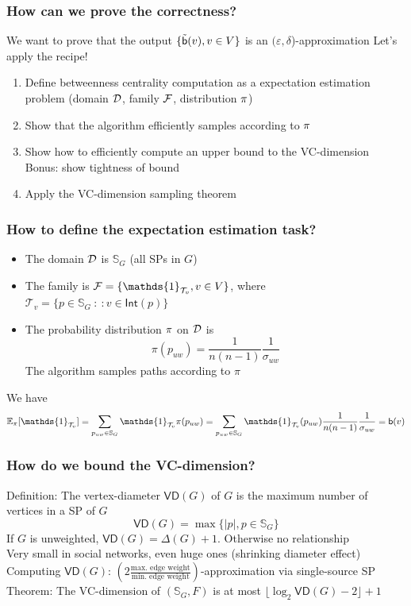 \begin{frame}
  \frametitle{How can we prove the correctness?}
  We want to prove that the output $\{\tilde{\mathsf{b}}(v), v\in V\}$ is an
  $(\varepsilon,\delta$)-approximation
  \vfill
  Let's apply the recipe!

  \begin{enumerate}
    \item  Define betweenness centrality computation as a expectation
      estimation problem (domain ${\cal D}$, family ${\cal F}$, distribution
      $\pi$)
    \item Show that the algorithm efficiently samples according to $\pi$
    \item Show how to efficiently compute an upper bound to the VC-dimension\\
      \quad Bonus: show tightness of bound
    \item Apply the VC-dimension sampling theorem
  \end{enumerate}
\end{frame}

\begin{frame}
  \frametitle{How to define the expectation estimation task?}
  \begin{itemize}
    \item The domain ${\cal D}$ is $\mathbb{S}_G$ (all SPs in $G$)\\
    \item The family is $\family=\{\mathds{1}_{\mathcal{T}_v}, v\in V\}$,
      where $\mathcal{T}_v=\{p\in\mathbb{S}_G ~:~: v\in\mathsf{Int}(p)\}$
    \item The probability distribution $\pi$ on ${\cal D}$ is
      \[
        \pi(p_{uw})=\frac{1}{n(n-1)}\frac{1}{\sigma_{uw}}
      \]
      The algorithm samples paths according to $\pi$
  \end{itemize}
  \vfill
  We have
  \[
    \expectation_\pi[\mathds{1}_{\mathcal{T}_v}]=\sum_{p_{uw}\in\mathbb{S}_G}\mathds{1}_{\mathcal{T}_v}\pi(p_{uw})=\sum_{p_{uw}\in\mathbb{S}_G}\mathds{1}_{\mathcal{T}_v}(p_{uw})\frac{1}{n(n-1)}\frac{1}{\sigma_{uw}}=\betw(v)
  \]
\end{frame}

\begin{frame}
  \frametitle{How do we bound the VC-dimension?}
  Definition: The vertex-diameter $\mathsf{VD}(G)$ of $G$ is the maximum
  number of vertices in a SP of $G$
  \[
    \mathsf{VD}(G)=\max\{|p|, p\in\mathbb{S}_G\}
  \]
  If $G$ is unweighted, $\mathsf{VD}(G)=\Delta(G)+1$. Otherwise no relationship\\
  Very small in social networks, even huge ones (shrinking diameter effect)
  \vfill
  Computing $\mathsf{VD}(G)$: $\left(2\frac{\mbox{max.~edge weight}}{\mbox{min.~edge
  weight}}\right)$-approximation via single-source SP
  \vfill
  Theorem: The VC-dimension of $(\mathbb{S}_G,F)$ is at most $\lfloor\log_2\mathsf{VD}(G)
  -2\rfloor +1$
\end{frame}

